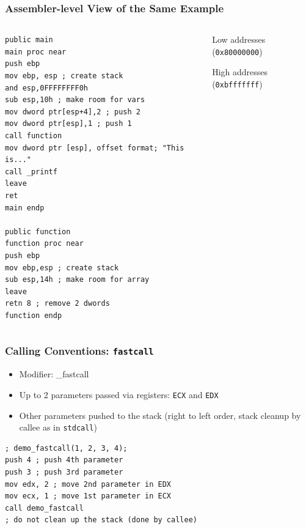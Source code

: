 \documentclass[]{beamer}
\begin{document}
\begin{frame}[fragile]
  \frametitle{Assembler-level View of the Same Example}
  \begin{columns}
    \begin{column}{.5\textwidth}

\begin{lstlisting}[language={[x86masm]Assembler},basicstyle=\tiny\ttfamily]
public main
main proc near
push ebp
mov ebp, esp ; create stack
and esp,0FFFFFFFF0h
sub esp,10h ; make room for vars
mov dword ptr[esp+4],2 ; push 2
mov dword ptr[esp],1 ; push 1
call function
mov dword ptr [esp], offset format; "This is..."
call _printf
leave
ret
main endp

public function
function proc near
push ebp
mov ebp,esp ; create stack
sub esp,14h ; make room for array
leave
retn 8 ; remove 2 dwords
function endp
\end{lstlisting}
    \end{column}

    \begin{column}{.5\textwidth}
    	\centering
    	\par{\scriptsize Low addresses ({\tt 0x80000000})}\\[.5em]
	\begin{drawstack}[scale=0.7, font=\footnotesize]
	\startframe
	\end{drawstack}
	\par{\scriptsize High addresses ({\tt 0xbfffffff})}
     \end{column}
  \end{columns}
  \begin{figure}
  \end{figure}
\end{frame}

\begin{frame}[fragile]
  \frametitle{Calling Conventions: {\tt fastcall}}
  \begin{itemize}
  \item Modifier: \alert{\_fastcall}
  \item Up to 2 parameters passed via registers: {\tt ECX} and {\tt EDX}
  \item Other parameters pushed to the stack (right to left order, stack cleanup by callee as in {\tt stdcall})
  \end{itemize}
\begin{lstlisting}[language={[x86masm]Assembler}]
; demo_fastcall(1, 2, 3, 4);
push 4 ; push 4th parameter
push 3 ; push 3rd parameter
mov edx, 2 ; move 2nd parameter in EDX
mov ecx, 1 ; move 1st parameter in ECX
call demo_fastcall
; do not clean up the stack (done by callee)
\end{lstlisting}
\end{frame}
\end{document}
